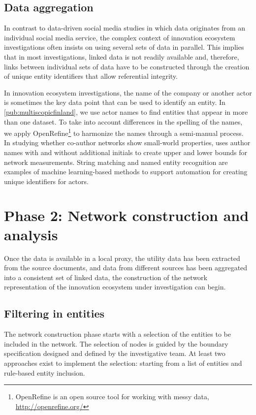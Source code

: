 \subsection{Data aggregation}

In contrast to data-driven social media studies in which data originates from an individual social media service, the complex context of innovation ecosystem investigations often insists on using several sets of data in parallel. This implies that in most investigations, linked data is not readily available and, therefore, links between individual sets of data have to be constructed through the creation of unique entity identifiers that allow referential integrity. 

In innovation ecosystem investigations, the name of the company or another actor is sometimes the key data point that can be used to identify an entity. In \ref{pub:multiscopicfinland}, we use actor names to find entities that appear in more than one dataset. To take into account differences in the spelling of the names, we apply OpenRefine\footnote{OpenRefine is an open source tool for working with messy data, \url{http://openrefine.org/}} to harmonize the names through a semi-manual process. In studying whether co-author networks show small-world properties, \cite{Newman2001TheNetworks} uses author names with and without additional initials to create upper and lower bounds for network measurements. String matching \citep{Navarro2001AMatching} and named entity recognition \citep{Finkel2005IncorporatingSampling} are examples of machine learning-based methods to support automation for creating unique identifiers for actors. 

\section{Phase 2: Network construction and analysis}
\label{subsec:modelphase2}

Once the data is available in a local proxy, the utility data has been extracted from the source documents, and data from different sources has been aggregated into a consistent set of linked data, the construction of the network representation of the innovation ecosystem under investigation can begin.

\subsection{Filtering in entities}

The network construction phase starts with a selection of the entities to be included in the network. The selection of nodes is guided by the boundary specification designed and defined by the investigative team. At least two approaches exist to implement the selection: starting from a list of entities and rule-based entity inclusion.

